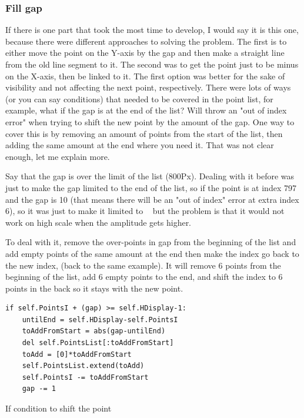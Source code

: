 \subsubsection{Fill gap}\label{sec:fillGap}
If there is one part that took the most time to develop, I would say it is this one, because there were different approaches to solving the problem. The first is to either move the point on the Y-axis by the gap and then make a straight line from the old line segment to it. The second was to get the point just to be minus on the X-axis, then be linked to it. The first option was better for the sake of visibility and not affecting the next point, respectively. There were lots of ways (or you can say conditions) that needed to be covered in the point list, for example, what if the gap is at the end of the list? Will throw an "out of index error" when trying to shift the new point by the amount of the gap. One way to cover this is by removing an amount of points from the start of the list, then adding the same amount at the end where you need it. That was not clear enough, let me explain more.

Say that the gap is over the limit of the list (800Px). Dealing with it before was just to make the gap limited to the end of the list, so if the point is at index 797 and the gap is 10 (that means there will be an "out of index" error at extra index 6), so it was just to make it limited to   but the problem is that it would not work on high scale when the amplitude gets higher.

To deal with it, remove the over-points in gap from the beginning of the list and add empty points of the same amount at the end then make the index go back to the new index, (back to the same example). It will remove 6 points from the beginning of the list, add 6 empty points to the end, and shift the index to 6 points in the back so it stays with the new point.

\begin{listing}[H]
\begin{verbatim}
if self.PointsI + (gap) >= self.HDisplay-1:
	untilEnd = self.HDisplay-self.PointsI
	toAddFromStart = abs(gap-untilEnd)
	del self.PointsList[:toAddFromStart]
	toAdd = [0]*toAddFromStart
	self.PointsList.extend(toAdd)
	self.PointsI -= toAddFromStart
	gap -= 1
\end{verbatim}
\caption{If condition to shift the point}
\label{code:overcomeGap}
\end{listing}

